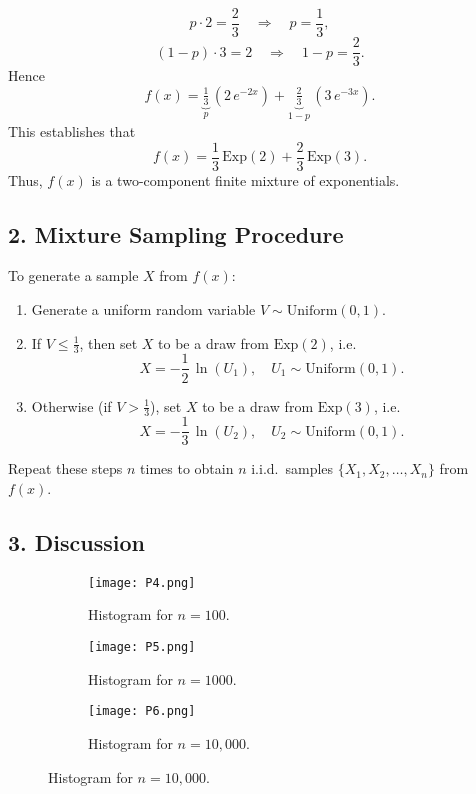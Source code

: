 \documentclass[final,11pt]{article}
\begin{document}
\begin{spacing}{1.25}
{\[
p \cdot 2 = \frac{2}{3}
\quad\Longrightarrow\quad p = \frac{1}{3},
\]
\[
(1-p)\cdot 3 = 2
\quad\Longrightarrow\quad 1-p = \frac{2}{3}.
\]
Hence 
\[
f(x) 
= \underbrace{\tfrac{1}{3}}_{p}\, (2\, e^{-2x})
+ \underbrace{\tfrac{2}{3}}_{1-p}\,(3\, e^{-3x}).
\]
This establishes that
\[
f(x) = \frac{1}{3}\,\text{Exp}(2) + \frac{2}{3}\,\text{Exp}(3).
\]
Thus, $f(x)$ is a two-component finite mixture of exponentials.

\subsection*{2. Mixture Sampling Procedure}
To generate a sample $X$ from $f(x)$:
\begin{enumerate}
 \item Generate a uniform random variable $V \sim \text{Uniform}(0,1)$.
 \item If $V \le \tfrac{1}{3}$, then set $X$ to be a draw from $\text{Exp}(2)$, i.e.\ 
 \[
   X = -\frac{1}{2}\,\ln(U_1), \quad U_1 \sim \text{Uniform}(0,1).
 \]
 \item Otherwise (if $V > \tfrac{1}{3}$), set $X$ to be a draw from $\text{Exp}(3)$, i.e.\
 \[
   X = -\frac{1}{3}\,\ln(U_2), \quad U_2 \sim \text{Uniform}(0,1).
 \]
\end{enumerate}
Repeat these steps $n$ times to obtain $n$ i.i.d.\ samples $\{X_1,X_2,\dots,X_n\}$ from $f(x)$.

\subsection*{3. Discussion}

\begin{figure}[htbp]
  \centering
  \begin{subfigure}[b]{0.31\textwidth}
    \centering
    \texttt{[image: P4.png]}
    \caption{Histogram for \(n=100\).}
  \end{subfigure}
  \hfill

  \begin{subfigure}[b]{0.31\textwidth}
    \centering
    \texttt{[image: P5.png]}
    \caption{Histogram for \(n=1000\).}
  \end{subfigure}
  \hfill

  \begin{subfigure}[b]{0.31\textwidth}
    \centering
    \texttt{[image: P6.png]}
    \caption{Histogram for \(n=10,000\).}
  \end{subfigure}
  

\end{figure}}
\end{spacing}
\end{document}
